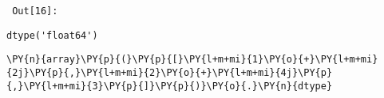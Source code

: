         {\par%
        \vspace{-1\smallerfontscale}%
        \noindent%
        \begin{minipage}{\cellleftmargin}%
    \hfill%
    {\smaller%
    \tt%
    \color{nbframe-out-prompt}%
    Out[16]:}%
    \hspace{\inputpadding}%
    \hspace{0em}%
    \hspace{3pt}%
    \end{minipage}%
        }%
    \begin{addmargin}[\cellleftmargin]{0em}%
    {\smaller%
    \vspace{-1\smallerfontscale}%
    
    
    
    \begin{verbatim}
dtype('float64')
    \end{verbatim}

    
}%
    \end{addmargin}%

{\par%
\vspace{-1\baselineskip}%
}%
\begin{notebookcell}[17]%
\begin{addmargin}[\cellleftmargin]{0em}%
{\smaller%
\par%
%
\vspace{-1\smallerfontscale}%
\begin{Verbatim}[commandchars=\\\{\}]
\PY{n}{array}\PY{p}{(}\PY{p}{[}\PY{l+m+mi}{1}\PY{o}{+}\PY{l+m+mi}{2j}\PY{p}{,}\PY{l+m+mi}{2}\PY{o}{+}\PY{l+m+mi}{4j}\PY{p}{,}\PY{l+m+mi}{3}\PY{p}{]}\PY{p}{)}\PY{o}{.}\PY{n}{dtype}
\end{Verbatim}
%
\par%
\vspace{-1\smallerfontscale}}%
\end{addmargin}
\end{notebookcell}

\par\vspace{1\smallerfontscale}%
    
